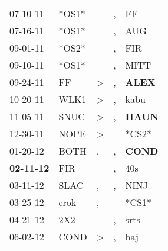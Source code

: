 \begin{supertabular}{p{0.07\textwidth}p{0.06\textwidth}p{0.02\textwidth}p{0.02\textwidth}p{0.06\textwidth}}
          07-10-11\textsuperscript{} &                            *OS1* &                  &                , &             FF\textsuperscript{} \\
          07-16-11\textsuperscript{} &                            *OS1* &                  &                , &            AUG\textsuperscript{} \\
          09-01-11\textsuperscript{} &                            *OS2* &                  &                , &            FIR\textsuperscript{} \\
          09-10-11\textsuperscript{} &                            *OS1* &                  &                , &           MITT\textsuperscript{} \\
          09-24-11\textsuperscript{} &             FF\textsuperscript{} &     \textgreater &                , &  \textbf{ALEX\textsuperscript{}} \\
          10-20-11\textsuperscript{} &           WLK1\textsuperscript{} &     \textgreater &                , &           kabu\textsuperscript{} \\
          11-05-11\textsuperscript{} &           SNUC\textsuperscript{} &     \textgreater &                , &  \textbf{HAUN\textsuperscript{}} \\
          12-30-11\textsuperscript{} &           NOPE\textsuperscript{} &     \textgreater &                  &                            *CS2* \\
          01-20-12\textsuperscript{} &           BOTH\textsuperscript{} &                , &                , &  \textbf{COND\textsuperscript{}} \\
 \textbf{02-11-12\textsuperscript{}} &            FIR\textsuperscript{} &                  &                , &            40s\textsuperscript{} \\
          03-11-12\textsuperscript{} &           SLAC\textsuperscript{} &                , &                , &           NINJ\textsuperscript{} \\
          03-25-12\textsuperscript{} &           crok\textsuperscript{} &                , &                  &                            *CS1* \\
          04-21-12\textsuperscript{} &            2X2\textsuperscript{} &                  &                , &           srts\textsuperscript{} \\
          06-02-12\textsuperscript{} &           COND\textsuperscript{} &     \textgreater &                , &            haj\textsuperscript{} \\

\end{supertabular}
